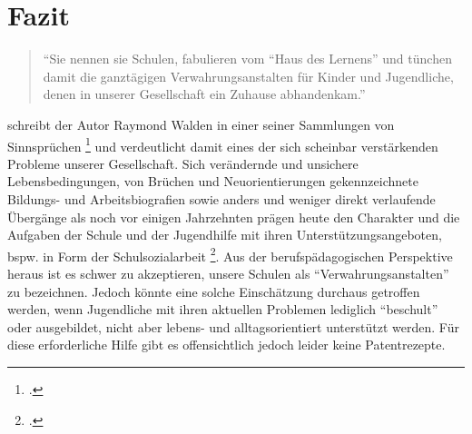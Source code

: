 \section{Fazit}
\label{sec:Fazit}

\begin{quotation}
\noindent
"`Sie nennen sie Schulen, fabulieren vom "`Haus des Lernens"' und tünchen damit die ganztägigen Verwahrungsanstalten für Kinder und Jugendliche, denen in unserer Gesellschaft ein Zuhause abhandenkam."'
\end{quotation}

\noindent
[\punkte] schreibt der Autor Raymond Walden in einer seiner Sammlungen von Sinnsprüchen \footcite[71]{Walden2005} und verdeutlicht damit eines der sich scheinbar verstärkenden Probleme unserer Gesellschaft. Sich verändernde und unsichere Lebensbedingungen, von Brüchen und Neuorientierungen gekennzeichnete Bildungs- und Arbeitsbiografien sowie anders und weniger direkt verlaufende Übergänge als noch vor einigen Jahrzehnten prägen heute den Charakter und die Aufgaben der Schule und der Jugendhilfe mit ihren Unterstützungsangeboten, bspw. in Form der Schulsozialarbeit \footcite[vgl.][9ff]{Bolder2010}. Aus der berufspädagogischen Perspektive heraus ist es schwer zu akzeptieren, unsere Schulen als "`Verwahrungsanstalten"' zu bezeichnen. Jedoch könnte eine solche Einschätzung durchaus getroffen werden, wenn Jugendliche mit ihren aktuellen Problemen lediglich "`beschult"' oder ausgebildet, nicht aber lebens- und alltagsorientiert unterstützt werden. Für diese erforderliche Hilfe gibt es offensichtlich jedoch leider keine Patentrezepte.
 
